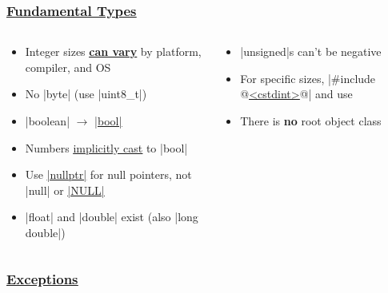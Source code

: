 \documentclass[glossy]{beamer}
\newcommand{\cppref}[2]{\href{http://en.cppreference.com/w/cpp/#1}{\underline{#2}}}
\newcommand{\refer}[1]{([shift={(.25em,.25em)}]pic cs:#1)}
\begin{document}

\begin{frame}[fragile=singleslide]
  \frametitle{\cppref{language/types}{Fundamental Types}}
  \begin{columns}[t]
    \begin{column}{6cm}
      \begin{itemize}
        \item Integer sizes \cppref{language/types\#Data_models}{\textbf{can vary}} by platform, compiler, and OS
        \item No \javainline|byte| (use \cppinline|uint8_t|)
        \item \javainline|boolean| $\rightarrow$ \cppref{language/types\#Boolean_type}{\cppinline|bool|}
        \item Numbers \cppref{language/implicit_cast}{implicitly cast} to \cppinline|bool|
        \item Use \cppref{language/nullptr}{\cppinline|nullptr|} for null pointers, not \javainline|null| or \cppref{types/NULL}{\cppinline|NULL|}
        \item \cppinline|float| and \cppinline|double| exist (also \cppinline|long double|)
      \end{itemize}
    \end{column}

    \begin{column}{6cm}
      \begin{itemize}
        \item \cppinline|unsigned|s can't be negative
        \item For specific sizes, \cppinline|#include @\cppref{preprocessor/include}{<cstdint>}@| and use 
        \item There is \textbf{no} root object class
      \end{itemize}
    \end{column}
  \end{columns}
\end{frame}


\begin{frame}[fragile=singleslide]
  \frametitle{\cppref{language/exceptions}{Exceptions}}
  

\end{frame}
\end{document}
